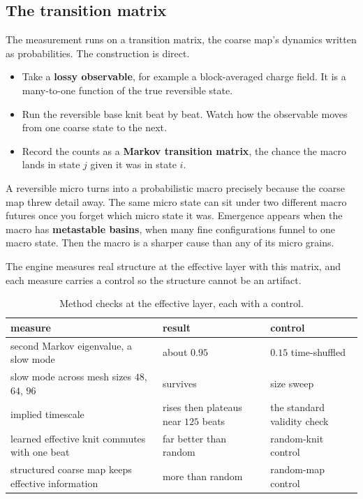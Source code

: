 \subsection{The transition matrix}

The measurement runs on a transition matrix, the coarse map's dynamics written as probabilities. The construction is direct.

\begin{itemize}
\item Take a \textbf{lossy observable}, for example a block-averaged charge field. It is a many-to-one function of the true reversible state.
\item Run the reversible base knit beat by beat. Watch how the observable moves from one coarse state to the next.
\item Record the counts as a \textbf{Markov transition matrix}, the chance the macro lands in state $j$ given it was in state $i$.
\end{itemize}

A reversible micro turns into a probabilistic macro precisely because the coarse map threw detail away. The same micro state can sit under two different macro futures once you forget which micro state it was. Emergence appears when the macro has \textbf{metastable basins}, when many fine configurations funnel to one macro state. Then the macro is a sharper cause than any of its micro grains.

The engine measures real structure at the effective layer with this matrix, and each measure carries a control so the structure cannot be an artifact.

\begin{table}[ht]
\centering
\begin{tabular}{@{}lll@{}}
\toprule
measure & result & control \\
\midrule
second Markov eigenvalue, a slow mode & about $0.95$ & $0.15$ time-shuffled \\
slow mode across mesh sizes $48$, $64$, $96$ & survives & size sweep \\
implied timescale & rises then plateaus near $125$ beats & the standard validity check \\
learned effective knit commutes with one beat & far better than random & random-knit control \\
structured coarse map keeps effective information & more than random & random-map control \\
\bottomrule
\end{tabular}
\caption{Method checks at the effective layer, each with a control.}
\label{tab:effective-measures}
\end{table}

